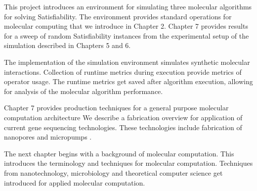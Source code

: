 This project introduces an environment for simulating three molecular algorithms for solving {\sc Satisfiability}.  The environment provides standard operations for molecular computing that we introduce in Chapter 2. Chapter 7 provides results for a sweep of random {\sc Satisfiability} instances from the experimental setup of the simulation described in Chapters 5 and 6.

The implementation of the simulation environment simulates synthetic molecular interactions.  Collection of runtime metrics during execution provide metrics of operator usage.  The runtime metrics get saved after algorithm execution, allowing for analysis of the molecular algorithm performance.
	
Chapter 7 provides production techniques for a general purpose molecular computation architecture We describe a fabrication overview for application of current gene sequencing technologies.  These technologies include fabrication of nanopores and micropumps \cite{ionTorrent, oxfordNanopore, Liao_Lee_Liu_Hsieh_Luo_2005}.

The next chapter begins with a background of molecular computation.  This introduces the terminology and techniques for molecular computation. Techniques from nanotechnology, microbiology and theoretical computer science get introduced for applied molecular computation.
